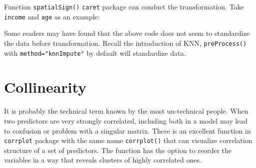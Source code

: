 \documentclass[12pt,]{krantz}
\makeatletter
\newenvironment{Shaded}{\begin{snugshade}}{\end{snugshade}}
\newcommand{\KeywordTok}[1]{\textcolor[rgb]{0.27,0.27,0.27}{\textbf{#1}}}
\newcommand{\DataTypeTok}[1]{\textcolor[rgb]{0.27,0.27,0.27}{#1}}
\newcommand{\DecValTok}[1]{\textcolor[rgb]{0.06,0.06,0.06}{#1}}
\newcommand{\StringTok}[1]{\textcolor[rgb]{0.5,0.5,0.5}{#1}}
\newcommand{\CommentTok}[1]{\textcolor[rgb]{0.37,0.37,0.37}{\textit{#1}}}
\newcommand{\OperatorTok}[1]{\textcolor[rgb]{0.43,0.43,0.43}{\textbf{#1}}}
\newcommand{\NormalTok}[1]{#1}
\newenvironment{kframe}{%
\medskip{}
\setlength{\fboxsep}{.8em}
 \def\at@end@of@kframe{}%
 \ifinner\ifhmode%
  \def\at@end@of@kframe{\end{minipage}}%
  \begin{minipage}{\columnwidth}%
 \fi\fi%
 \def\FrameCommand##1{\hskip\@totalleftmargin \hskip-\fboxsep
 \colorbox{shadecolor}{##1}\hskip-\fboxsep
     \hskip-\linewidth \hskip-\@totalleftmargin \hskip\columnwidth}%
 \MakeFramed {\advance\hsize-\width
   \@totalleftmargin\z@ \linewidth\hsize
   \@setminipage}}%
 {\par\unskip\endMakeFramed%
 \at@end@of@kframe}
\renewenvironment{Shaded}{\begin{kframe}}{\end{kframe}}
\theoremstyle{definition}
\theoremstyle{definition}
\theoremstyle{definition}
\theoremstyle{remark}
\makeatother
\begin{document}
Function \texttt{spatialSign()} \texttt{caret} package can conduct the
transformation. Take \texttt{income} and \texttt{age} as an example:

\begin{Shaded}
\end{Shaded}

Some readers may have found that the above code does not seem to
standardize the data before transformation. Recall the introduction of
KNN, \texttt{preProcess()} with \texttt{method="knnImpute"} by default
will standardize data.

\section{Collinearity}\label{collinearity}

It is probably the technical term known by the most un-technical people.
When two predictors are very strongly correlated, including both in a
model may lead to confusion or problem with a singular matrix. There is
an excellent function in \texttt{corrplot} package with the same name
\texttt{corrplot()} that can visualize correlation structure of a set of
predictors. The function has the option to reorder the variables in a
way that reveals clusters of highly correlated ones.
\end{document}
